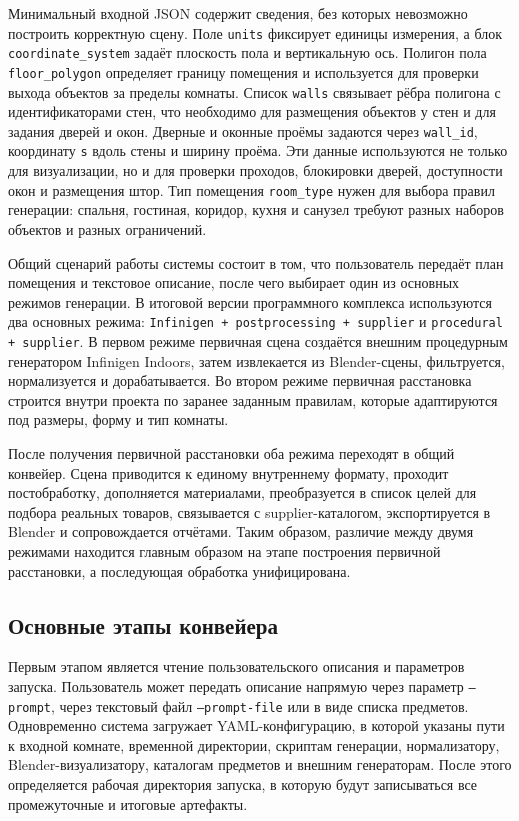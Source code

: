 \documentclass[times]{itmo-student-thesis}
\begin{document}
Минимальный входной JSON содержит сведения, без которых невозможно построить корректную сцену. Поле \texttt{units} фиксирует единицы измерения, а блок \texttt{coordinate\_system} задаёт плоскость пола и вертикальную ось. Полигон пола \texttt{floor\_polygon} определяет границу помещения и используется для проверки выхода объектов за пределы комнаты. Список \texttt{walls} связывает рёбра полигона с идентификаторами стен, что необходимо для размещения объектов у стен и для задания дверей и окон. Дверные и оконные проёмы задаются через \texttt{wall\_id}, координату \texttt{s} вдоль стены и ширину проёма. Эти данные используются не только для визуализации, но и для проверки проходов, блокировки дверей, доступности окон и размещения штор. Тип помещения \texttt{room\_type} нужен для выбора правил генерации: спальня, гостиная, коридор, кухня и санузел требуют разных наборов объектов и разных ограничений.

Общий сценарий работы системы состоит в том, что пользователь передаёт план помещения и текстовое описание, после чего выбирает один из основных режимов генерации. В итоговой версии программного комплекса используются два основных режима: \texttt{Infinigen + postprocessing + supplier} и \texttt{procedural + supplier}. В первом режиме первичная сцена создаётся внешним процедурным генератором Infinigen Indoors, затем извлекается из Blender-сцены, фильтруется, нормализуется и дорабатывается. Во втором режиме первичная расстановка строится внутри проекта по заранее заданным правилам, которые адаптируются под размеры, форму и тип комнаты.

После получения первичной расстановки оба режима переходят в общий конвейер. Сцена приводится к единому внутреннему формату, проходит постобработку, дополняется материалами, преобразуется в список целей для подбора реальных товаров, связывается с supplier-каталогом, экспортируется в Blender и сопровождается отчётами. Таким образом, различие между двумя режимами находится главным образом на этапе построения первичной расстановки, а последующая обработка унифицирована.

\subsection{Основные этапы конвейера}

Первым этапом является чтение пользовательского описания и параметров запуска. Пользователь может передать описание напрямую через параметр \texttt{--prompt}, через текстовый файл \texttt{--prompt-file} или в виде списка предметов. Одновременно система загружает YAML-конфигурацию, в которой указаны пути к входной комнате, временной директории, скриптам генерации, нормализатору, Blender-визуализатору, каталогам предметов и внешним генераторам. После этого определяется рабочая директория запуска, в которую будут записываться все промежуточные и итоговые артефакты.
\end{document}
